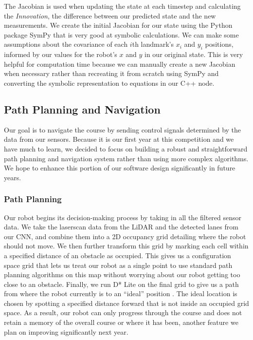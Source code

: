The Jacobian is used when updating the state at each timestep and calculating the \textit{Innovation}, the difference between our predicted state and the new measurements. We create the initial Jacobian for our state using the Python package SymPy that is very good at symbolic calculations. We can make some assumptions about the covariance of each $i$th landmark's $x_i$ and $y_i$ positions, informed by our values for the robot's $x$ and $y$ in our original state. This is very helpful for computation time because we can manually create a new Jacobian when necessary rather than recreating it from scratch using SymPy and converting the symbolic representation to equations in our C++ node.

\subsection{Path Planning and Navigation}

Our goal is to navigate the course by sending control signals determined by the data from our sensors. Because it is our first year at this competition and we have much to learn, we decided to focus on building a robust and straightforward path planning and navigation system rather than using more complex algorithms. We hope to enhance this portion of our software design significantly in future years.

\subsubsection{Path Planning}

Our robot begins its decision-making process by taking in all the filtered sensor data. We take the laserscan data from the LiDAR and the detected lanes from our CNN, and combine them into a 2D occupancy grid detailing where the robot should not move. We then further transform this grid by marking each cell within a specified distance of an obstacle as occupied. This gives us a configuration space grid that lets us treat our robot as a single point to use standard path planning algorithms on this map without worrying about our robot getting too close to an obstacle. Finally, we run D* Lite on the final grid to give us a path from where the robot currently is to an ``ideal'' position \cite{DStar}. The ideal location is chosen by spotting a specified distance forward that is not inside an occupied grid space. As a result, our robot can only progress through the course and does not retain a memory of the overall course or where it has been, another feature we plan on improving significantly next year.

